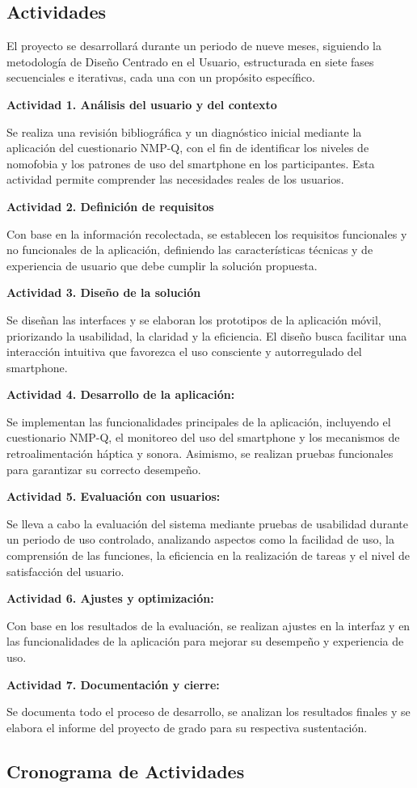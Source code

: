 \subsection{Actividades}
El proyecto se desarrollará durante un periodo de nueve meses, siguiendo la metodología de Diseño Centrado en el Usuario, estructurada en siete fases secuenciales e iterativas, cada una con un propósito específico.

\textbf{Actividad 1. Análisis del usuario y del contexto}

Se realiza una revisión bibliográfica y un diagnóstico inicial mediante la aplicación del cuestionario NMP-Q, con el fin de identificar los niveles de nomofobia y los patrones de uso del smartphone en los participantes. Esta actividad permite comprender las necesidades reales de los usuarios.

\textbf{Actividad 2. Definición de requisitos}

Con base en la información recolectada, se establecen los requisitos funcionales y no funcionales de la aplicación, definiendo las características técnicas y de experiencia de usuario que debe cumplir la solución propuesta.

\textbf{Actividad 3. Diseño de la solución}

Se diseñan las interfaces y se elaboran los prototipos de la aplicación móvil, priorizando la usabilidad, la claridad y la eficiencia. El diseño busca facilitar una interacción intuitiva que favorezca el uso consciente y autorregulado del smartphone.

\textbf{Actividad 4. Desarrollo de la aplicación:}

Se implementan las funcionalidades principales de la aplicación, incluyendo el cuestionario NMP-Q, el monitoreo del uso del smartphone y los mecanismos de retroalimentación háptica y sonora. Asimismo, se realizan pruebas funcionales para garantizar su correcto desempeño.

\textbf{Actividad 5. Evaluación con usuarios:}

Se lleva a cabo la evaluación del sistema mediante pruebas de usabilidad durante un periodo de uso controlado, analizando aspectos como la facilidad de uso, la comprensión de las funciones, la eficiencia en la realización de tareas y el nivel de satisfacción del usuario.

\textbf{Actividad 6. Ajustes y optimización:}

Con base en los resultados de la evaluación, se realizan ajustes en la interfaz y en las funcionalidades de la aplicación para mejorar su desempeño y experiencia de uso.

\textbf{Actividad 7. Documentación y cierre:}

Se documenta todo el proceso de desarrollo, se analizan los resultados finales y se elabora el informe del proyecto de grado para su respectiva sustentación.

\subsection{Cronograma de Actividades}


